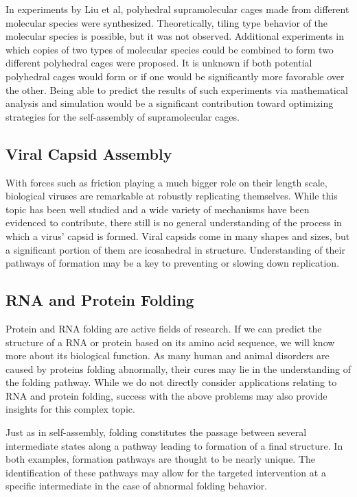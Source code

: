In experiments by Liu et al, polyhedral supramolecular cages made from different molecular species were synthesized. Theoretically, tiling type behavior of the molecular species is possible, but it was not observed. Additional experiments in which copies of two types of molecular species could be combined to form two different polyhedral cages were proposed. It is unknown if both potential polyhedral cages would form or if one would be significantly more favorable over the other. Being able to predict the results of such experiments via mathematical analysis and simulation would be a significant contribution toward optimizing strategies for the self-assembly of supramolecular cages. 

\subsection{Viral Capsid Assembly}

With forces such as friction playing a much bigger role on their length scale, biological viruses are remarkable at robustly replicating themselves. While this topic has been well studied and a wide variety of mechanisms have been evidenced to contribute, there still is no general understanding of the process in which a virus' capsid is formed. Viral capsids come in many shapes and sizes, but a significant portion of them are icosahedral in structure. Understanding of their pathways of formation may be a key to preventing or slowing down replication.  

\subsection{RNA and Protein Folding}

Protein and RNA folding are active fields of research. If we can predict the structure of a RNA or protein based on its amino acid sequence, we will know more about its biological function. As many human and animal disorders are caused by proteins folding abnormally, their cures may lie in the understanding of the folding pathway. While we do not directly consider applications relating to RNA and protein folding, success with the above problems may also provide insights for this complex topic. 

Just as in self-assembly, folding constitutes the passage between several intermediate states along a pathway leading to formation of a final structure. In both examples, formation pathways are thought to be nearly unique. The identification of these pathways may allow for the targeted intervention at a specific intermediate in the case of abnormal folding behavior. 

